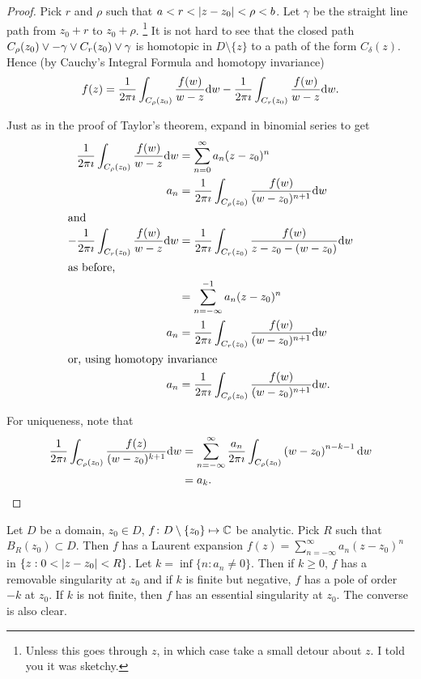 \documentclass{notes}
\theoremstyle{plain}
\begin{document}
\begin{proof}
Pick $r$ and $\rho$ such that $a < r < \left|z-z_0\right| < \rho < b$.  Let $\gamma$
be the straight line path from $z_0 + r$ to $z_0 + \rho$. \footnote{Unless this
goes through $z$, in which case take a small detour about $z$.  I told you it
was sketchy.}  It is not hard to see that the closed path 
$C_\rho(z_0) \vee -\gamma \vee \-C_r(z_0) \vee \gamma$
is homotopic in $D \setminus \{ z \}$ to a path of the form $C_\delta(z)$.
Hence (by Cauchy's Integral Formula and homotopy invariance)
\[
f(z) = \frac{1}{2 \pi \imath} \int_{C_\rho(z_0)} \frac{f(w)}{w-z} \mathrm{d} w
-\frac{1}{2 \pi \imath} \int_{C_r(z_0)} \frac{f(w)}{w-z} \mathrm{d} w.
\]

Just as in the proof of Taylor's theorem, expand in binomial series to get
\begin{align*}
\frac{1}{2 \pi \imath} \int_{C_\rho(z_0)} \frac{f(w)}{w-z} \mathrm{d} w
&= \sum_{n=0}^\infty a_n (z-z_0)^n\\
a_n &= \frac{1}{2 \pi \imath}  \int_{C_\rho(z_0)}
\frac{f(w)}{(w-z_0)^{n+1}} \mathrm{d} w \\
\intertext{and}
-\frac{1}{2 \pi \imath} \int_{C_r(z_0)} \frac{f(w)}{w-z} \mathrm{d} w
&= \frac{1}{2 \pi \imath} \int_{C_r(z_0)} \frac{f(w)}{z-z_0 - (w-z_0)} \mathrm{d} w \\
\intertext{as before,}
&=\sum_{n=-\infty}^{-1} a_n (z-z_0)^n \\
a_n &= \frac{1}{2 \pi \imath}  \int_{C_r(z_0)} \frac{f(w)}{(w-z_0)^{n+1}} \mathrm{d} w \\
\intertext{or, using homotopy invariance}
a_n &= \frac{1}{2 \pi \imath}  \int_{C_\rho(z_0)} \frac{f(w)}{(w-z_0)^{n+1}}
\mathrm{d} w.
\end{align*}

For uniqueness, note that
\begin{align*}
\frac{1}{2 \pi \imath} \int_{C_\rho(z_0)} \frac{f(z)}{(w-z_0)^{k+1}} \mathrm{d} w
&= \sum_{n=-\infty}^\infty \frac{a_n}{2 \pi \imath} \int_{C_\rho(z_0)}
\left( w-z_0 \right)^{n-k-1} \mathrm{d} w \\
&=a_k.
\end{align*}
\end{proof}

Let $D$ be a domain, $z_0 \in D$, $f \colon D \setminus \{ z_0 \} \mapsto \mathbb{C}$ be
analytic.  Pick $R$ such that $B_R(z_0) \subset D$.  Then $f$ has a Laurent
expansion $f(z) = \sum_{n=-\infty}^\infty a_n (z-z_0)^n$ in
$\{z : 0 < \left|z-z_0\right| < R\}$.  Let $k = \inf \{ n : a_n \neq 0 \}$.  Then
if $k \ge 0$, $f$ has a removable singularity at $z_0$ and if $k$ is finite but
negative, $f$ has a pole of order $-k$ at $z_0$.  If $k$ is not finite, then
$f$ has an essential singularity at $z_0$.  The converse is also clear.
\end{document}

